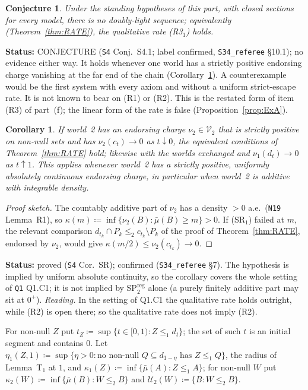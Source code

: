 \documentclass[11pt]{article}
\newtheorem{corollary}[theorem]{Corollary}
\newtheorem{conjecture}[theorem]{Conjecture}
\theoremstyle{definition}
\theoremstyle{remark}
\newcommand{\src}[1]{\texttt{#1}}
\newcommand{\status}[1]{\par\smallskip\noindent\textbf{Status:} #1\par\smallskip}
\begin{document}
\begin{conjecture}\label{conj:NDL}
Under the standing hypotheses of this part, with closed sections for every model, there is no doubly-light sequence; equivalently (Theorem~\ref{thm:RATE}), the qualitative rate (R3$_1$) holds.
\end{conjecture}
\status{CONJECTURE (\src{S4} Conj.~S4.1; label confirmed, \src{S34\_referee} \S10.1); no evidence either way. It holds whenever one world has a strictly positive endorsing charge vanishing at the far end of the chain (Corollary~\ref{cor:SR}). A counterexample would be the first system with every axiom and without a uniform strict-escape rate. It is not known to bear on (R1) or (R2). This is the restated form of item (R3) of part~(f); the linear form of the rate is false (Proposition~\ref{prop:ExA}).}

\begin{corollary}\label{cor:SR}
If world~2 has an endorsing charge $\nu_2\in\mathcal V_2$ that is strictly positive on non-null sets and has $\nu_2(c_t)\to0$ as $t\downarrow0$, the equivalent conditions of Theorem~\ref{thm:RATE} hold; likewise with the worlds exchanged and $\nu_1(d_t)\to0$ as $t\uparrow1$. This applies whenever world~2 has a strictly positive, uniformly absolutely continuous endorsing charge, in particular when world~2 is additive with integrable density.
\end{corollary}
\begin{proof}[Proof sketch]
The countably additive part of $\nu_2$ has a density $>0$ a.e.\ (\src{N19} Lemma~R1), so $\kappa(m)\coloneqq\inf\{\nu_2(B):\bar\mu(B)\ge m\}>0$. If (SR$_1$) failed at $m$, the relevant comparison $d_{t_k}\cap P_k\le_2c_{t_k}\setminus P_k$ of the proof of Theorem~\ref{thm:RATE}, endorsed by $\nu_2$, would give $\kappa(m/2)\le\nu_2(c_{t_k})\to0$.
\end{proof}
\status{proved (\src{S4} Cor.~SR); confirmed (\src{S34\_referee} \S7). The hypothesis is implied by uniform absolute continuity, so the corollary covers the whole setting of \src{Q1} Q1.C1; it is not implied by SP$^{\mathrm{reg}}_2$ alone (a purely finitely additive part may sit at $0^+$). \emph{Reading.} In the setting of Q1.C1 the qualitative rate holds outright, while (R2) is open there; so the qualitative rate does not imply (R2).}

For non-null $Z$ put $t_Z\coloneqq\sup\{t\in[0,1):Z\le_1d_t\}$; the set of such $t$ is an initial segment and contains $0$. Let $\eta_1(Z,1)\coloneqq\sup\{\eta>0:\text{no non-null }Q\subseteq d_{1-\eta}\text{ has }Z\le_1Q\}$, the radius of Lemma~T$_1$ at $1$, and $\kappa_1(Z)\coloneqq\inf\{\bar\mu(A):Z\le_1A\}$; for non-null $W$ put $\kappa_2(W)\coloneqq\inf\{\bar\mu(B):W\le_2B\}$ and $\mathcal U_2(W)\coloneqq\{B:W\le_2B\}$.
\end{document}
